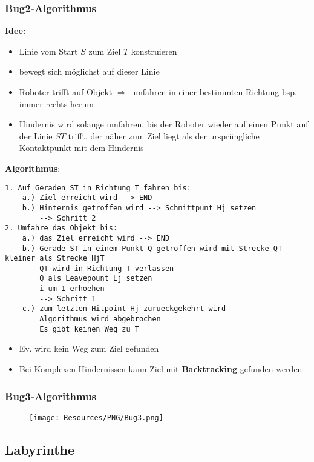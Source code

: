\subsubsection{Bug2-Algorithmus}
\textbf{Idee:}
\begin{itemize}
	\item Linie vom Start $S$ zum Ziel $T$ konstruieren
	\item bewegt sich möglichst auf dieser Linie
	\item Roboter trifft auf Objekt $\Rightarrow$ umfahren in einer bestimmten Richtung bsp. immer rechts herum
	\item Hindernis wird solange umfahren, bis der Roboter wieder auf einen Punkt auf der Linie $ST$ trifft, der näher zum Ziel liegt als der ursprüngliche Kontaktpunkt mit dem Hindernis
\end{itemize}
\textbf{Algorithmus}:
\begin{lstlisting}
1. Auf Geraden ST in Richtung T fahren bis:
	a.) Ziel erreicht wird --> END
	b.) Hinternis getroffen wird --> Schnittpunt Hj setzen
		--> Schritt 2
2. Umfahre das Objekt bis:
	a.) das Ziel erreicht wird --> END
	b.) Gerade ST in einem Punkt Q getroffen wird mit Strecke QT kleiner als Strecke HjT
		QT wird in Richtung T verlassen
		Q als Leavepount Lj setzen
		i um 1 erhoehen
		--> Schritt 1
	c.) zum letzten Hitpoint Hj zurueckgekehrt wird
		Algorithmus wird abgebrochen
		Es gibt keinen Weg zu T
\end{lstlisting}
\begin{itemize}
	\item Ev. wird kein Weg zum Ziel gefunden
\end{itemize}
\begin{itemize}
	\item Bei Komplexen Hindernissen kann Ziel mit \textbf{Backtracking} gefunden werden
\end{itemize}
\subsubsection{Bug3-Algorithmus}
\begin{figure}[H]
	\begin{center}
		\texttt{[image: Resources/PNG/Bug3.png]}
		\caption{}
		\label{fig:PNG/Bug3.png}
	\end{center}
\end{figure}
\subsection{Labyrinthe}
